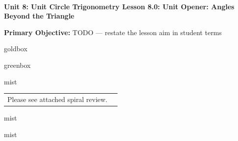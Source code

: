 \documentclass[10pt]{article}
\newcommand{\UnitNumberName}{Unit 8: Unit Circle Trigonometry \quad}
\newcommand{\LessonNumberName}{Lesson 8.0: Unit Opener: Angles Beyond the Triangle}
\begin{document}
\begin{center}
    {\Large\bfseries \CourseName \\
    {\small\bfseries \UnitNumberName \LessonNumberName}}
\end{center}

\begin{tcolorbox}[colback=mist, colframe=royal, boxrule=0.9pt, arc=2mm,
    left=2mm, right=2mm, top=1.5mm, bottom=1.5mm]
    \textbf{Primary Objective:} TODO --- restate the lesson aim in student terms
\end{tcolorbox}

\renewcommand{\arraystretch}{1.6}
\begin{skillbox}{goldbox}
\end{skillbox}

\begin{skillbox}{greenbox}
\end{skillbox}

\begin{fixedskillbox}{mist}
    \begin{tabularx}{\linewidth}{@{}X c@{}}
        \begin{minipage}[t]{0.55\linewidth}\vspace{0pt}
            Please see attached spiral review.  %
        \end{minipage}
        &
        \begin{minipage}[t]{0.38\linewidth}\vspace{0pt}\centering
        \end{minipage}
    \end{tabularx}
\end{fixedskillbox}

\begin{skillbox}[Hook]{mist}
\end{skillbox}

\begin{skillbox}[Lesson]{mist}
\end{skillbox}
\end{document}
